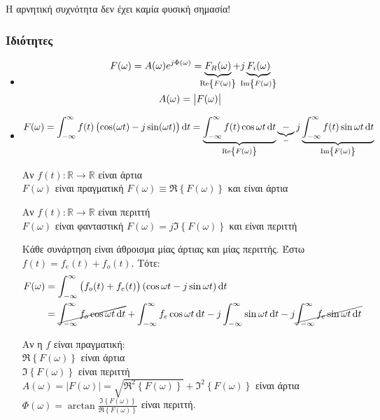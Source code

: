 \documentclass[11pt,a4paper,titlepage,fleqn]{article}
\begin{document}
	Η αρνητική συχνότητα δεν έχει καμία φυσική σημασία!
	 
	 \subsubsection{Ιδιότητες}
	 \begin{itemize}

     \item
	 \begin{gather*}
	 F(\omega)= A(\omega )e^{j\Phi(\omega )} =
	 \underbrace{F_R(\omega )}_{\mathclap{\Re\left\lbrace F(\omega ) \right\rbrace}}
	 +j\underbrace{F_i(\omega )}_{\mathclap{\Im\left\lbrace F(\omega ) \right\rbrace}}
	 \\ A(\omega )=\left| F(\omega ) \right|
	 \end{gather*}
	 \item
	 \begin{gather*}
	 F(\omega )=\int_{-\infty}^{\infty} f(t)\left(\cos(\omega t)-j\sin(\omega t)\right)
	 \dif t = \underbrace{\int_{-\infty}^{\infty} f(t)\cos\omega t\dif t}_{%
	 	\Re\left\lbrace F(\omega ) \right\rbrace
	 	}
	 	\underbrace{-}_{-}
	 	j \underbrace{\int_{-\infty}^{\infty} f(t)\sin\omega t\dif t}_{%
	 		\Im\left\lbrace F(\omega ) \right\rbrace
	 		}
	 \end{gather*}
	 
	 Αν \( f(t):\mathbb R \to\mathbb R  \) είναι άρτια\\
	 \( F(\omega ) \) είναι πραγματική \quad \( 
	 F(\omega ) \equiv \Re\left\lbrace F(\omega ) \right\rbrace
	  \) και είναι άρτια
	  
	 Αν \( f(t):\mathbb R \to\mathbb R  \) είναι περιττή\\
	 \( F(\omega ) \) είναι φανταστική \quad \( 
	 F(\omega ) = j\Im \left\lbrace F(\omega) \right\rbrace
	  \) και είναι περιττή
	  
	 Κάθε συνάρτηση είναι άθροισμα μίας άρτιας και μίας περιττής. Έστω
	 \( f(t) = f_e(t)+f_o(t) \). Τότε:
	 \begin{align*}
	 F(\omega ) &= \int_{-\infty}^{\infty} \left(
	 f_o(t)+f_e(t)
	 \right)(\cos\omega t -j\sin \omega t)\dif t
	 \\ &= \cancel{\int_{-\infty}^{\infty} f_o\cos\omega t\dif t}
	 + \int_{-\infty}^{\infty} f_e\cos\omega t\dif t
	 - j\int_{-\infty}^{\infty} \sin\omega t\dif t
	 - j \cancel{\int_{-\infty}^{\infty} f_e\sin\omega t\dif t }
	 \end{align*}
	 
	 Αν η \( f \) είναι πραγματική: \\
	 \( \Re\left\lbrace F(\omega ) \right\rbrace \) είναι άρτια \\
	 \( \Im\left\lbrace F(\omega ) \right\rbrace \) είναι περιττή \\
	 \( A(\omega)=\left|F(\omega )\right| = 
	 \sqrt{\Re^2\left\lbrace F(\omega ) \right\rbrace}
	 +\Im^2\left\lbrace F(\omega) \right\rbrace
	  \) είναι άρτια\\
	  \( \Phi(\omega) =\arctan
	  \frac{\Im\left\lbrace F(\omega) \right\rbrace}%
	  {\Re\left\lbrace F(\omega ) \right\rbrace}
	   \) είναι περιττή.
	   

\end{itemize}
\end{document}
